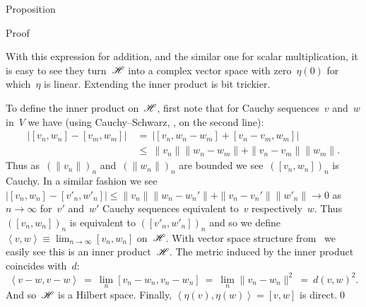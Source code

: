 \documentclass[b]{subfiles}
\begin{document}
\begin{parsec}
\begin{point}{Proposition}
\begin{point}{Proof}
\begin{point}
With this expression for addition, and the similar one for
    scalar multiplication, it is easy to see
    they turn~$\mathscr{H}$ into a complex vector space with zero~$\eta(0)$
    for which~$\eta$ is linear.
Extending the inner product is bit trickier.
\end{point}
\begin{point}%
To define the inner product on~$\mathscr{H}$,
first note that for Cauchy sequences~$v$ and~$w$ in~$V$
we have (using Cauchy--Schwarz, , on the second line):
\begin{align*}
    \bigl|[v_n,w_n] - [v_m,w_m]\bigr|
    & \ =\  \bigl|[v_n,w_n-w_m] + [v_n - v_m,w_m]\bigr| \\
    & \ \leq\  \|v_n\| \|w_n - w_m\| + \|v_n-v_m\|\|w_m\|.
\end{align*}
Thus as~$(\|v_n\|)_n$ and~$(\|w_n\|)_n$ are bounded
we see~$([v_n,w_n])_n$ is Cauchy.
In a similar fashion we see~$\bigl|[v_n,w_n] - [v'_n,w'_n]\bigr|
    \leq \|v_n\| \|w_n - w_n'\| + \|v_n-v_n'\|\|w'_n\|\to 0$ as~$n\to \infty$
    for~$v'$ and~$w'$ Cauchy sequences equivalent
to~$v$ respectively~$w$.
Thus
$([v_n,w_n])_n$ is equivalent to
$([v'_n,w'_n])_n$
    and so
    we define~$\left<v,w\right>
        \equiv \lim_{n\to \infty} [v_n,w_n]$ on~$\mathscr{H}$.
With vector space structure from~
we easily see this is an inner product~$\mathscr{H}$.
The metric induced by the inner product coincides with~$d$:
\begin{equation*}
    \left<v-w,v-w\right>
   \ =\ \lim_{n}[v_n-w_n,v_n-w_n]
    \ =\ \lim_{n}\|v_n-w_n\|^2
    \ =\  d(v,w)^2.
\end{equation*}
And so~$\mathscr{H}$ is a Hilbert space.
Finally, $\left<\eta(v),\eta(w)\right>=[v,w]$ is direct.\qed
\end{point}
\end{point}
\end{point}
\end{parsec}
\end{document}

